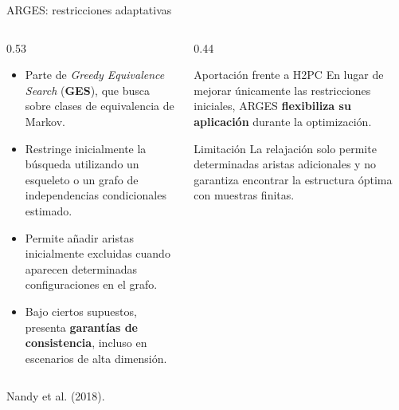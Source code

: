 \documentclass[aspectratio=169,11pt]{beamer}
\begin{document}
\begin{frame}[t]{ARGES: restricciones adaptativas}
  \begin{columns}[T,onlytextwidth]

    \begin{column}{0.53\textwidth}
      \begin{itemize}
        \item Parte de \textit{Greedy Equivalence Search}
        (\textbf{GES}), que busca sobre clases de
        equivalencia de Markov.

        \item Restringe inicialmente la búsqueda
        utilizando un esqueleto o un grafo de
        independencias condicionales estimado.

        \item Permite añadir aristas inicialmente excluidas cuando aparecen determinadas configuraciones en el grafo.
        \item Bajo ciertos supuestos, presenta
        \textbf{garantías de consistencia},
        incluso en escenarios de alta dimensión.
      \end{itemize}
    \end{column}

    \begin{column}{0.44\textwidth}

      \begin{exampleblock}{Aportación frente a H2PC}
        En lugar de mejorar únicamente las
        restricciones iniciales, ARGES
        \textbf{flexibiliza su aplicación}
        durante la optimización.
      \end{exampleblock}

      \begin{alertblock}{Limitación}
        La relajación solo permite determinadas
        aristas adicionales y no garantiza
        encontrar la estructura óptima
        con muestras finitas.
      \end{alertblock}

    \end{column}
  \end{columns}

  {\scriptsize\color{upmgray}Nandy et al. (2018).}
\end{frame}
\end{document}
